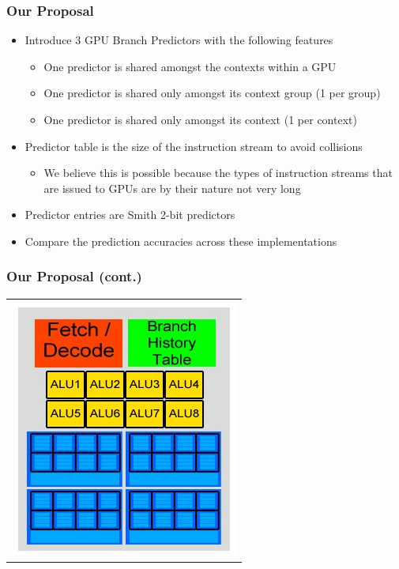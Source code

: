 \documentclass{beamer}
\begin{document}
\begin{frame}
	\frametitle{Our Proposal}
	\begin{itemize}
		\item Introduce 3 GPU Branch Predictors with the following features
		\begin{itemize}
			\item One predictor is shared amongst the contexts within a GPU
			\item One predictor is shared only amongst its context group (1 per group)
			\item One predictor is shared only amongst its context (1 per context)
		\end{itemize}
		\item Predictor table is the size of the instruction stream to avoid collisions
		\begin{itemize}
			\item We believe this is possible because the types of instruction streams that are issued to GPUs are by their nature not very long
		\end{itemize}
		\item Predictor entries are Smith 2-bit predictors
		\item Compare the prediction accuracies across these implementations
	\end{itemize}
\end{frame}

\begin{frame}
	\frametitle{Our Proposal (cont.)}
	\begin{tabular}{c}
		\includegraphics[width=.5\textwidth]{Our-GPU---per-core-predictor.jpg}
	\end{tabular}
\end{frame}
\end{document}
